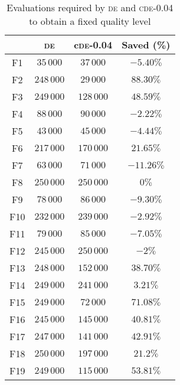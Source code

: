 \begin{table}[!t]
\caption{Evaluations required by \textsc{de} and \textsc{cde}-0.04 to obtain a fixed quality level}
\label{tab:de_vs_cde004_convergence}
\centering
\begin{scriptsize}
\begin{tabular}{c c c c}
\hline
 			& \textsc{de}  & c\textsc{de}-0.04 & Saved (\%) \\ \hline
F1    & $35\,000$       & $37\,000$            & $-5.40\%$   \\ \hline
F2    & $248\,000$      & $29\,000$            & $88.30\%$   \\ \hline
F3    & $249\,000$      & $128\,000$           & $48.59\%$   \\ \hline
F4    & $88\,000$       & $90\,000$            & $-2.22\%$   \\ \hline
F5    & $43\,000$       & $45\,000$            & $-4.44\%$   \\ \hline
F6    & $217\,000$      & $170\,000$           & $21.65\%$   \\ \hline
F7    & $63\,000$       & $71\,000$            & $-11.26\%$  \\ \hline
F8    & $250\,000$      & $250\,000$           & $0\%$       \\ \hline
F9    & $78\,000$       & $86\,000$            & $-9.30\%$   \\ \hline
F10   & $232\,000$      & $239\,000$           & $-2.92\%$   \\ \hline
F11   & $79\,000$       & $85\,000$            & $-7.05\%$   \\ \hline
F12   & $245\,000$      & $250\,000$           & $-2\%$      \\ \hline
F13   & $248\,000$      & $152\,000$           & $38.70\%$   \\ \hline
F14   & $249\,000$      & $241\,000$           & $3.21\%$    \\ \hline
F15   & $249\,000$      & $72\,000$            & $71.08\%$   \\ \hline
F16   & $245\,000$      & $145\,000$           & $40.81\%$   \\ \hline
F17   & $247\,000$      & $141\,000$           & $42.91\%$   \\ \hline
F18   & $250\,000$      & $197\,000$           & $21.2\%$    \\ \hline
F19   & $249\,000$      & $115\,000$           & $53.81\%$   \\ \hline
\end{tabular}
\end{scriptsize}
\end{table}

